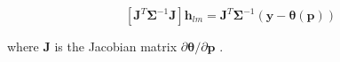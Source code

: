 \begin{equation}
\left[ \mathbf{J}^T\bm{\Sigma}^{-1}\mathbf{J}\right]\mathbf{h}_{lm} =\mathbf{J}^T\bm{\Sigma}^{-1}(\mathbf{y}-\bm{\theta}(\mathbf{p}))
\label{hlm}
\end{equation}

\noindent where $\mathbf{J}$ is the Jacobian matrix $\partial \bm{\theta}/\partial \mathbf{p}$ \cite{levenberg1944,marquardt:1963}. 

%



